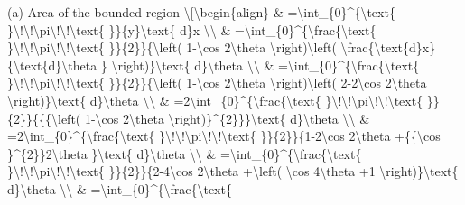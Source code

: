 \item {}

(a) Area of the bounded region \textbackslash{[}\textbackslash begin\{align\}
\& =\textbackslash int\_\{0\}\textasciicircum\{\textbackslash text\{
\}\textbackslash !\textbackslash !\textbackslash pi\textbackslash !\textbackslash !\textbackslash text\{
\}\}\{y\}\textbackslash text\{ d\}x \textbackslash\textbackslash{}
\& =\textbackslash int\_\{0\}\textasciicircum\{\textbackslash frac\{\textbackslash text\{
\}\textbackslash !\textbackslash !\textbackslash pi\textbackslash !\textbackslash !\textbackslash text\{
\}\}\{2\}\}\{\textbackslash left( 1-\textbackslash cos 2\textbackslash theta
\textbackslash right)\textbackslash left( \textbackslash frac\{\textbackslash text\{d\}x\}\{\textbackslash text\{d\}\textbackslash theta
\} \textbackslash right)\}\textbackslash text\{ d\}\textbackslash theta
\textbackslash\textbackslash{} \& =\textbackslash int\_\{0\}\textasciicircum\{\textbackslash frac\{\textbackslash text\{
\}\textbackslash !\textbackslash !\textbackslash pi\textbackslash !\textbackslash !\textbackslash text\{
\}\}\{2\}\}\{\textbackslash left( 1-\textbackslash cos 2\textbackslash theta
\textbackslash right)\textbackslash left( 2-2\textbackslash cos
2\textbackslash theta \textbackslash right)\}\textbackslash text\{
d\}\textbackslash theta \textbackslash\textbackslash{} \& =2\textbackslash int\_\{0\}\textasciicircum\{\textbackslash frac\{\textbackslash text\{
\}\textbackslash !\textbackslash !\textbackslash pi\textbackslash !\textbackslash !\textbackslash text\{
\}\}\{2\}\}\{\{\{\textbackslash left( 1-\textbackslash cos 2\textbackslash theta
\textbackslash right)\}\textasciicircum\{2\}\}\}\textbackslash text\{
d\}\textbackslash theta \textbackslash\textbackslash{} \& =2\textbackslash int\_\{0\}\textasciicircum\{\textbackslash frac\{\textbackslash text\{
\}\textbackslash !\textbackslash !\textbackslash pi\textbackslash !\textbackslash !\textbackslash text\{
\}\}\{2\}\}\{1-2\textbackslash cos 2\textbackslash theta +\{\{\textbackslash cos
\}\textasciicircum\{2\}\}2\textbackslash theta \}\textbackslash text\{
d\}\textbackslash theta \textbackslash\textbackslash{} \& =\textbackslash int\_\{0\}\textasciicircum\{\textbackslash frac\{\textbackslash text\{
\}\textbackslash !\textbackslash !\textbackslash pi\textbackslash !\textbackslash !\textbackslash text\{
\}\}\{2\}\}\{2-4\textbackslash cos 2\textbackslash theta +\textbackslash left(
\textbackslash cos 4\textbackslash theta +1 \textbackslash right)\}\textbackslash text\{
d\}\textbackslash theta \textbackslash\textbackslash{} \& =\textbackslash int\_\{0\}\textasciicircum\{\textbackslash frac\{\textbackslash text\{
